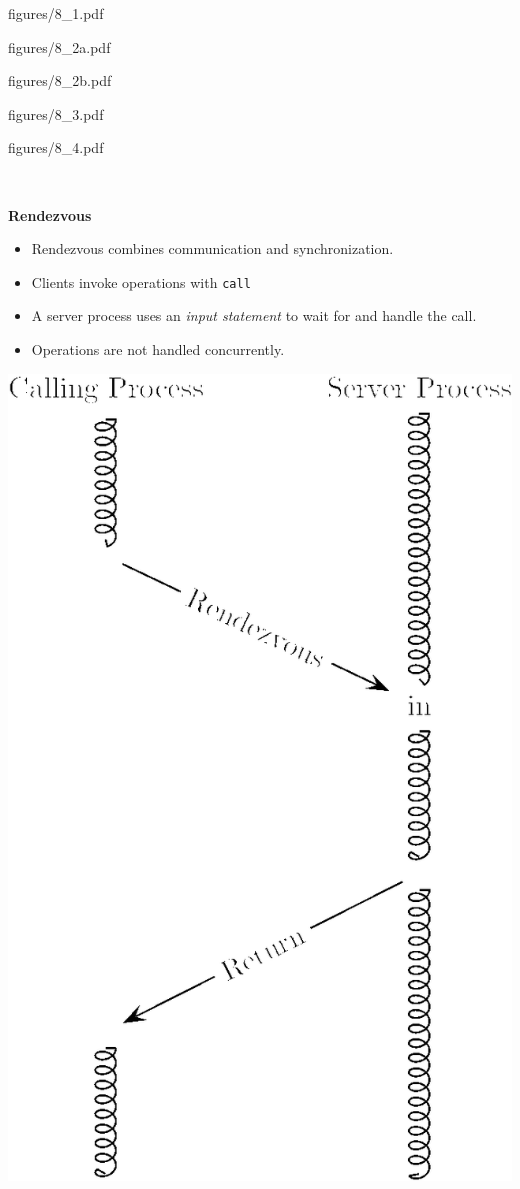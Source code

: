 \documentclass{article}
\newcommand{\nop}[1]{}
\newcommand{\myfig}[1]{\newpage\begin{overpic}[scale=1.5]{figures/#1}}
\newcommand{\myfigs}[2]{\newpage\begin{overpic}[scale=#1]{figures/#2}}
\newcommand{\myfigend}{\end{overpic}}
\newcommand{\bi}{\begin{itemize}}
\newcommand{\ii}{\item}
\newcommand{\ei}{\end{itemize}}
\newcommand{\ti}[1]{
\newpage
\mbox{~}

\vspace{1.25in}
\centerline{\bf #1}
}
\begin{document}
\myfigs{1.25}{8_1.pdf}
\myfigend
\myfig{8_2a.pdf}
\myfigend
\myfigs{1.3}{8_2b.pdf}
\myfigend
\myfigs{1.2}{8_3.pdf}
\myfigend
\myfig{8_4.pdf}
\myfigend

\ti{Rendezvous}
\begin{multicols}{2}
\bi
\ii Rendezvous combines communication and synchronization.
\ii Clients invoke operations with {\tt call}
\ii A server process uses an {\em input statement} to wait for and
handle the call. 
\ii Operations are not handled concurrently.
\ei
\vfill
\columnbreak
\hfill
\includegraphics[scale=0.4]{figures/rendezvous.png}
\end{multicols}

\nop{
\myfig{operations.pdf}
}
\end{document}
